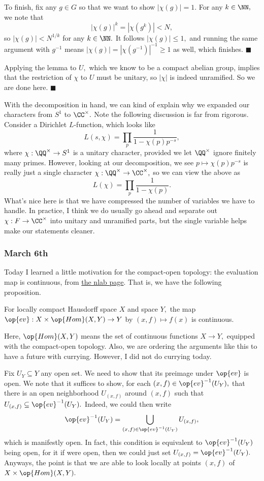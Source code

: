 To finish, fix any $g\in G$ so that we want to show $|\chi(g)|=1.$ For any $k\in\NN,$ we note that
\[|\chi(g)|^k=\left|\chi\left(g^k\right)\right|<N,\]
so $|\chi(g)|<N^{1/k}$ for any $k\in\NN.$ It follows $|\chi(g)|\le1,$ and running the same argument with $g^{-1}$ means $|\chi(g)|=|\chi(g^{-1})|^{-1}\ge1$ as well, which finishes. $\blacksquare$

Applying the lemma to $U,$ which we know to be a compact abelian group, implies that the restriction of $\chi$ to $U$ must be unitary, so $|\chi|$ is indeed unramified. So we are done here. $\blacksquare$

With the decomposition in hand, we can kind of explain why we expanded our characters from $S^1$ to $\CC^\times.$ Note the following discussion is far from rigorous. Consider a Dirichlet $L$-function, which looks like
\[L(s,\chi)=\prod_p\frac1{1-\chi(p)p^{-s}},\]
where $\chi:\QQ^\times\to S^1$ is a unitary character, provided we let $\QQ^\times$ ignore finitely many primes. However, looking at our decomposition, we see $p\mapsto\chi(p)p^{-s}$ is really just a single character $\chi:\QQ^\times\to\CC^\times,$ so we can view the above as
\[L(\chi)=\prod_p\frac1{1-\chi(p)}.\]
What's nice here is that we have compressed the number of variables we have to handle. In practice, I think we do usually go ahead and separate out $\chi:F\to\CC^\times$ into unitary and unramified parts, but the single variable helps make our statements cleaner.

\subsubsection{March 6th}
Today I learned a little motivation for the compact-open topology: the evaluation map is continuous, from \href{https://ncatlab.org/nlab/show/compact-open+topology}{the nlab page}. That is, we have the following proposition.
\begin{proposition}
    For locally compact Hausdorff space $X$ and space $Y,$ the map $\op{ev}:X\times\op{Hom}(X,Y)\to Y$ by $(x,f)\mapsto f(x)$ is continuous.
\end{proposition}
Here, $\op{Hom}(X,Y)$ means the set of continuous functions $X\to Y,$ equipped with the compact-open topology. Also, we are ordering the arguments like this to have a future with currying. However, I did not do currying today.

Fix $U_Y\subseteq Y$ any open set. We need to show that its preimage under $\op{ev}$ is open. We note that it suffices to show, for each $(x,f)\in\op{ev}^{-1}(U_Y),$ that there is an open neighborhood $U_{(x,f)}$ around $(x,f)$ such that $U_{(x,f)}\subseteq\op{ev}^{-1}(U_Y).$ Indeed, we could then write
\[\op{ev}^{-1}(U_Y)=\bigcup_{(x,f)\in\op{ev}^{-1}(U_Y)}U_{(x,f)},\]
which is manifestly open. In fact, this condition is equivalent to $\op{ev}^{-1}(U_Y)$ being open, for it if were open, then we could just set $U_{(x,f)}=\op{ev}^{-1}(U_Y).$ Anyways, the point is that we are able to look locally at points $(x,f)$ of $X\times\op{Hom}(X,Y).$


